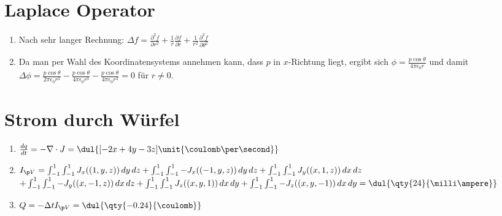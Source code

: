 \documentclass{article}
\begin{document}

\section{Laplace Operator}
\begin{enumerate}[label=\alph*)]
    
    \item Nach sehr langer Rechnung: $\Delta f = \frac{\partial^2 f}{\partial r^2} + \frac{1}{r}\frac{\partial f}{\partial r} + \frac{1}{r^2}\frac{\partial^2 f}{\partial \theta^2}$
    {\tiny\emph{{}}} \normalsize 
    
    \item Da man per Wahl des Koordinatensystems annehmen kann, dass $p$ in $x$-Richtung liegt, ergibt sich $\phi = \frac{p \cos \theta}{4 \pi \epsilon_0 r}$ und damit 
    $\Delta \phi = \frac{p \cos \theta}{2 \pi \epsilon_0 r^3}
    - \frac{p \cos \theta}{4 \pi \epsilon_0 r^3}
    - \frac{p \cos \theta}{4 \pi \epsilon_0 r^3} = 0$ für $r \neq 0$.
\end{enumerate}

\section{Strom durch Würfel}
\begin{enumerate}[label=\alph*)]
    \item $\frac{dq}{dt} = - \nabla \cdot J = \dul{[-2x + 4y - 3z] \unit{\coulomb \per \second} }$
    
    \item $I_{\p V} = \int_{-1}^{1} \int_{-1}^{1} J_x((1, y, z)) \, dy \, dz 
    + \int_{-1}^{1} \int_{-1}^{1} -J_x((-1, y, z)) \, dy \, dz
    + \int_{-1}^{1} \int_{-1}^{1} J_y((x, 1, z)) \, dx \, dz$ \\
    $ + \int_{-1}^{1} \int_{-1}^{1} -J_y((x, -1, z)) \, dx \, dz
    + \int_{-1}^{1} \int_{-1}^{1} J_z((x, y, 1)) \, dx \, dy
    + \int_{-1}^{1} \int_{-1}^{1} -J_z((x, y, -1)) \, dx \, dy
    = \dul{\qty{24}{\milli \ampere}}$ 
    
    \item $Q = - \Delta t I_{\p V} = \dul{\qty{-    0.24}{\coulomb}}$
\end{enumerate}
\end{document}
